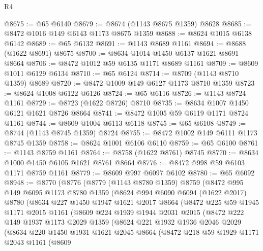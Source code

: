 \begin{lexlean}{R4}
\begin{coremodule}
@8675 := @65 @6140
@8679 := @8674 (@1143 @8675 @1359) @8628
@8685 := @8472 @1016 @149 @6143 @1173 @8675 @1359
@8688 := @8624 @1015 @6138 @6142
@8689 := @65 @6132
@8691 := @1143 @8689 @1161
@8694 := @8688 (@1622 @8691) @8675
@8700 := @8634 @1014 @1450 @6137 @1621 @8691 @8664
@8706 := @8472 @1012 @59 @6135 @1171 @8689 @1161
@8709 := @8609 @1011 @6129 @6134
@8710 := @65 @6124
@8714 := @8709 (@1143 @8710 @1359) @8689
@8720 := @8472 @1009 @149 @6127 @1173 @8710 @1359
@8723 := @8624 @1008 @6122 @6126
@8724 := @65 @6116
@8726 := @1143 @8724 @1161
@8729 := @8723 (@1622 @8726) @8710
@8735 := @8634 @1007 @1450 @6121 @1621 @8726 @8664
@8741 := @8472 @1005 @59 @6119 @1171 @8724 @1161
@8744 := @8609 @1004 @6113 @6118
@8745 := @65 @6108
@8749 := @8744 (@1143 @8745 @1359) @8724
@8755 := @8472 @1002 @149 @6111 @1173 @8745 @1359
@8758 := @8624 @1001 @6106 @6110
@8759 := @65 @6100
@8761 := @1143 @8759 @1161
@8764 := @8758 (@1622 @8761) @8745
@8770 := @8634 @1000 @1450 @6105 @1621 @8761 @8664
@8776 := @8472 @998 @59 @6103 @1171 @8759 @1161
@8779 := @8609 @997 @6097 @6102
@8780 := @65 @6092
@8948 := @8770
    (@8776
      (@8779
        (@1143 @8780 @1359)
        @8759
        (@8472
          @995
          @149
          @6095
          @1173
          @8780
          @1359
          (@8624
            @994
            @6090
            @6094
            (@1622 @2017)
            @8780
            (@8634
              @227
              @1450
              @1947
              @1621
              @2017
              @8664
              (@8472
                @225
                @59
                @1945
                @1171
                @2015
                @1161
                (@8609
                  @224
                  @1939
                  @1944
                  @2031
                  @2015
                  (@8472
                    @222
                    @149
                    @1937
                    @1173
                    @2029
                    @1359
                    (@8624
                      @221
                      @1932
                      @1936
                      @2046
                      @2029
                      (@8634
                        @220
                        @1450
                        @1931
                        @1621
                        @2045
                        @8664
                        (@8472
                          @218
                          @59
                          @1929
                          @1171
                          @2043
                          @1161
                          (@8609

\end{coremodule}
\end{lexlean}
